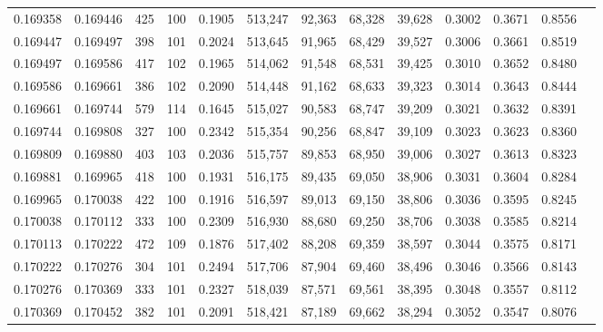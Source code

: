 \begin{tabular}{rrrrrrrrrrrrr}
0.169358 & 0.169446 &   425 & 100 &                                     0.1905 & 513,247 &  92,363 &  68,328 &  39,628 & 0.3002 & 0.3671 & 0.8556 \\
0.169447 & 0.169497 &   398 & 101 &                                     0.2024 & 513,645 &  91,965 &  68,429 &  39,527 & 0.3006 & 0.3661 & 0.8519 \\
0.169497 & 0.169586 &   417 & 102 &                                     0.1965 & 514,062 &  91,548 &  68,531 &  39,425 & 0.3010 & 0.3652 & 0.8480 \\
0.169586 & 0.169661 &   386 & 102 &                                     0.2090 & 514,448 &  91,162 &  68,633 &  39,323 & 0.3014 & 0.3643 & 0.8444 \\
0.169661 & 0.169744 &   579 & 114 &                                     0.1645 & 515,027 &  90,583 &  68,747 &  39,209 & 0.3021 & 0.3632 & 0.8391 \\
0.169744 & 0.169808 &   327 & 100 &                                     0.2342 & 515,354 &  90,256 &  68,847 &  39,109 & 0.3023 & 0.3623 & 0.8360 \\
0.169809 & 0.169880 &   403 & 103 &                                     0.2036 & 515,757 &  89,853 &  68,950 &  39,006 & 0.3027 & 0.3613 & 0.8323 \\
0.169881 & 0.169965 &   418 & 100 &                                     0.1931 & 516,175 &  89,435 &  69,050 &  38,906 & 0.3031 & 0.3604 & 0.8284 \\
0.169965 & 0.170038 &   422 & 100 &                                     0.1916 & 516,597 &  89,013 &  69,150 &  38,806 & 0.3036 & 0.3595 & 0.8245 \\
0.170038 & 0.170112 &   333 & 100 &                                     0.2309 & 516,930 &  88,680 &  69,250 &  38,706 & 0.3038 & 0.3585 & 0.8214 \\
0.170113 & 0.170222 &   472 & 109 &                                     0.1876 & 517,402 &  88,208 &  69,359 &  38,597 & 0.3044 & 0.3575 & 0.8171 \\
0.170222 & 0.170276 &   304 & 101 &                                     0.2494 & 517,706 &  87,904 &  69,460 &  38,496 & 0.3046 & 0.3566 & 0.8143 \\
0.170276 & 0.170369 &   333 & 101 &                                     0.2327 & 518,039 &  87,571 &  69,561 &  38,395 & 0.3048 & 0.3557 & 0.8112 \\
0.170369 & 0.170452 &   382 & 101 &                                     0.2091 & 518,421 &  87,189 &  69,662 &  38,294 & 0.3052 & 0.3547 & 0.8076 \\

\end{tabular}
